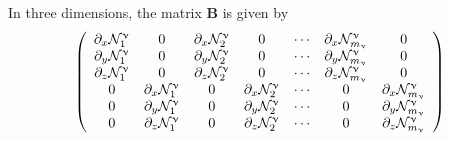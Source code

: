 In three dimensions, the matrix ${\bm B}$ is given by
\[
\left(
\begin{array}{cccccccccc}
\partial_x {\mathcal{N}}_1^\upnu & 0  & \partial_x {\mathcal{N}}_2^\upnu & 0  & \cdots & \partial_x {\mathcal{N}}^\upnu_{m_\upnu} & 0 \\
\partial_y {\mathcal{N}}_1^\upnu & 0  & \partial_y {\mathcal{N}}_2^\upnu & 0  & \cdots & \partial_y {\mathcal{N}}^\upnu_{m_\upnu} & 0 \\
\partial_z {\mathcal{N}}_1^\upnu & 0  & \partial_z {\mathcal{N}}_2^\upnu & 0  & \cdots & \partial_z {\mathcal{N}}^\upnu_{m_\upnu} & 0 \\
0 & \partial_x {\mathcal{N}}_1^\upnu  & 0& \partial_x {\mathcal{N}}_2^\upnu  & \cdots & 0 & \partial_x {\mathcal{N}}^\upnu_{m_\upnu}  \\
0 & \partial_y {\mathcal{N}}_1^\upnu  & 0& \partial_y {\mathcal{N}}_2^\upnu  & \cdots & 0 & \partial_y {\mathcal{N}}^\upnu_{m_\upnu}  \\
0 & \partial_z {\mathcal{N}}_1^\upnu  & 0& \partial_z {\mathcal{N}}_2^\upnu  & \cdots & 0 & \partial_z {\mathcal{N}}^\upnu_{m_\upnu}  
\end{array}
\right) 
\]



